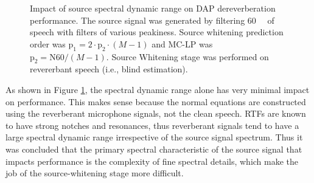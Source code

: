 \begin{figure}[H]
	\vspace{1em}
	
	\label{subfig:params_source_spectrum_shaped_compare:C}
	
	\caption[Impact of source spectral dynamic range on DAP dereverberation performance]{Impact of source spectral dynamic range on DAP dereverberation performance. The source signal was generated by filtering \qty{60}{\milli\sec} of speech with filters of various peakiness. Source whitening prediction order was $\mathrm{p_1} = 2 \cdot \mathrm{p_2} \cdot (M-1)$ and MC-LP was $\mathrm{p_2} = \mathrm{N60} / (M-1)$. Source Whitening stage was performed on revererbant speech (i.e., blind estimation).}
	\label{fig:params_source_spectrum_shaped_compare}
	
\end{figure}

As shown in Figure \ref{fig:params_source_spectrum_shaped_compare}, the spectral dynamic range alone has very minimal impact on performance. This makes sense because the normal equations are constructed using the reverberant microphone signals, not the clean speech. RTFs are known to have strong notches and resonances, thus reverberant signals tend to have a large spectral dynamic range irrespective of the source signal spectrum. Thus it was concluded that the primary spectral characteristic of the source signal that impacts performance is the complexity of fine spectral details, which make the job of the source-whitening stage more difficult.


